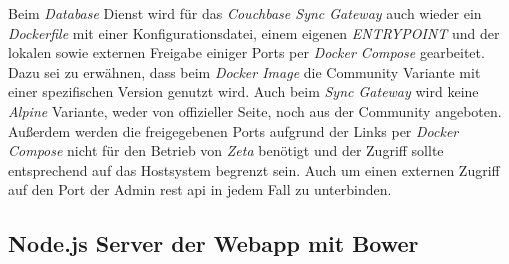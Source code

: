 Beim \textit{Database} Dienst wird für das \textit{Couchbase Sync Gateway} auch wieder ein \textit{Dockerfile} mit einer Konfigurationsdatei, einem eigenen \textit{ENTRYPOINT} und der lokalen sowie externen Freigabe einiger Ports per \textit{Docker Compose} gearbeitet. Dazu sei zu erwähnen, dass beim \textit{Docker Image} die Community Variante mit einer spezifischen Version genutzt wird. Auch beim \textit{Sync Gateway} wird keine \textit{Alpine} Variante, weder von offizieller Seite, noch aus der Community angeboten. Außerdem werden die freigegebenen Ports aufgrund der Links per \textit{Docker Compose} nicht für den Betrieb von \textit{Zeta} benötigt und der Zugriff sollte entsprechend auf das Hostsystem begrenzt sein. Auch um einen externen Zugriff auf den Port der Admin \ac{rest} \ac{api} in jedem Fall zu unterbinden.

\subsection{Node.js Server der Webapp mit Bower}

